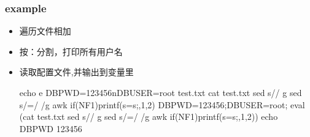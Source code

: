 \documentclass[a4paper,10pt,english]{sphinxmanual}
\begin{document}
\subsubsection{example}
\label{\detokenize{linux/shell:example}}\begin{itemize}
\item {} 
遍历文件相加

\begin{sphinxVerbatim}[commandchars=\\\{\}]
    
  
\end{sphinxVerbatim}

\item {} 
按：分割，打印所有用户名

\begin{sphinxVerbatim}[commandchars=\\\{\}]
   
\end{sphinxVerbatim}

\item {} 
读取配置文件,并输出到变量里

\begin{sphinxVerbatim}[commandchars=\\\{\}]
echo \PYGZhy{}e \PYGZdq{}DB\PYGZus{}PWD=123456\PYGZbs{}nDB\PYGZus{}USER=root\PYGZdq{} \PYGZgt{} test.txt
cat test.txt \textbar{}sed \PYGZdq{}s\PYGZsh{}//\PYGZsh{} \PYGZsh{}g\PYGZdq{} \textbar{} sed \PYGZdq{}s/=/ /g\PYGZdq{} \textbar{} awk  \PYGZsq{}\PYGZob{}if(NF\PYGZgt{}1)\PYGZob{}printf(\PYGZdq{}\PYGZpc{}s=\PYGZbs{}\PYGZdq{}\PYGZpc{}s\PYGZbs{}\PYGZdq{};\PYGZdq{},\PYGZdl{}1,\PYGZdl{}2)\PYGZcb{}\PYGZcb{}\PYGZsq{}
DB\PYGZus{}PWD=\PYGZdq{}123456\PYGZdq{};DB\PYGZus{}USER=\PYGZdq{}root\PYGZdq{};
eval \PYGZdl{}(cat test.txt \textbar{}sed \PYGZdq{}s\PYGZsh{}//\PYGZsh{} \PYGZsh{}g\PYGZdq{} \textbar{} sed \PYGZdq{}s/=/ /g\PYGZdq{} \textbar{} awk  \PYGZsq{}\PYGZob{}if(NF\PYGZgt{}1)\PYGZob{}printf(\PYGZdq{}\PYGZpc{}s=\PYGZbs{}\PYGZdq{}\PYGZpc{}s\PYGZbs{}\PYGZdq{};\PYGZdq{},\PYGZdl{}1,\PYGZdl{}2)\PYGZcb{}\PYGZcb{}\PYGZsq{})
echo \PYGZdl{}DB\PYGZus{}PWD
123456
\end{sphinxVerbatim}


\end{itemize}
\end{document}
